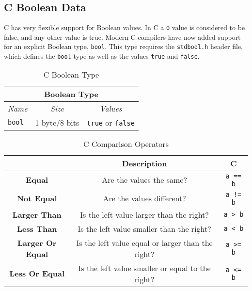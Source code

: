\clearpage
\subsection{C Boolean Data} %
\label{sub:c_boolean_data}

C has very flexible support for Boolean values. In C a \texttt{0} value is considered to be false, and any other value is true. Modern C compilers have now added support for an explicit Boolean type, \texttt{bool}. This type requires the \texttt{stdbool.h} header file, which defines the \texttt{bool} type as well as the values \texttt{true} and \texttt{false}.

\begin{table}[h] 
\begin{minipage}{\textwidth}
\centering
\begin{tabular}{|l|c|c|}
\hline
\multicolumn{3}{|c|}{\textbf{Boolean Type}} \\
\hline
\emph{Name} & \emph{Size} & \emph{Values} \\
\hline
\texttt{bool} & 1 byte/8 bits & \texttt{true} or \texttt{false} \\
\hline
\end{tabular}
\caption{C Boolean Type}\label{tbl:c-boolean}
\end{minipage}
\end{table}

\begin{table}[h]
  \centering
  \begin{tabular}{|c|c|c|}
    \hline
     & \textbf{Description} & \textbf{C} \\
    \hline
    \textbf{Equal} & Are the values the same? & \texttt{a == b} \\
    \hline
    \textbf{Not Equal} & Are the values different? & \texttt{a != b} \\
    \hline
    \textbf{Larger Than} & Is the left value larger than the right? & \texttt{a > b}  \\
    \hline
    \textbf{Less Than} & Is the left value smaller than the right? & \texttt{a < b}  \\
    \hline
    \textbf{Larger Or Equal} & Is the left value equal or larger than the right? & \texttt{a >= b}  \\
    \hline
    \textbf{Less Or Equal} & Is the left value smaller or equal to the right? & \texttt{a <= b}  \\
    \hline
  \end{tabular}
  \caption{C Comparison Operators}
  \label{tbl:c_comparison_op}
\end{table}

